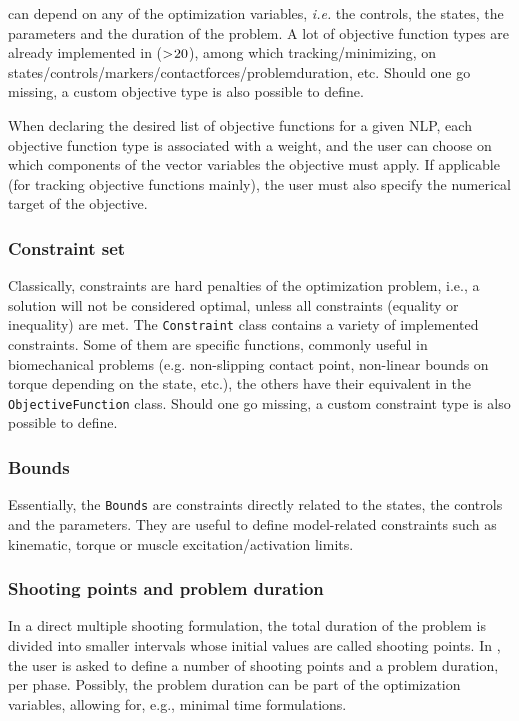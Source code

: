 \objectives can depend on any of the optimization variables, \textit{i.e.} the controls, the states, the parameters and the duration of the problem. 
A lot of objective function types are already implemented in \bioptim ($>\negmedspace 20$), among which tracking\:/\:minimizing, on states\:/\:controls\:/\:markers\:/\:contact\:forces\:/\:problem\:duration, etc. 
Should one go missing, a custom objective type is also possible to define.

When declaring the desired list of objective functions for a given NLP, each objective function type is associated with a weight, and the user can choose on which components of the vector variables the objective must apply. 
If applicable (for tracking objective functions mainly), the user must also specify the numerical target of the objective.

\subsubsection{Constraint set}
Classically, constraints are hard penalties of the optimization problem, i.e., a solution will not be considered optimal, unless all constraints (equality or inequality) are met.
The \texttt{Constraint} class contains a variety of implemented constraints.
Some of them are specific functions, commonly useful in biomechanical problems (e.g. non-slipping contact point, non-linear bounds on torque depending on the state, etc.), the others have their equivalent in the \texttt{ObjectiveFunction} class.
Should one go missing, a custom constraint type is also possible to define.

\subsubsection{Bounds}
Essentially, the \texttt{Bounds} are constraints directly related to the states, the controls and the parameters.
They are useful to define model-related constraints such as kinematic, torque or muscle excitation\:/\:activation limits. 

\subsubsection{Shooting points and problem duration}
In a direct multiple shooting formulation, the total duration of the problem is divided into smaller intervals whose initial values are called shooting points. 
In \bioptim, the user is asked to define a number of shooting points and a problem duration, per phase.
Possibly, the problem duration can be part of the optimization variables, allowing for, e.g., minimal time formulations.

